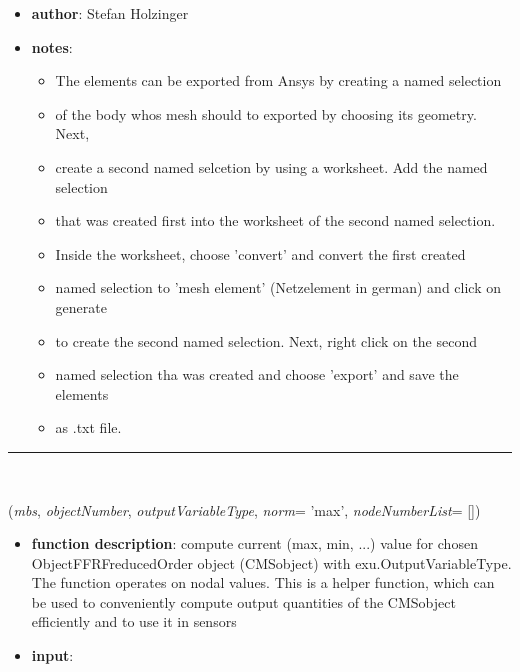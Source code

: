\begin{itemize}[leftmargin=1.4cm]
\begin{itemize}[leftmargin=1.4cm]
\begin{itemize}[leftmargin=1.4cm]
\begin{itemize}[leftmargin=0.5cm]
\begin{itemize}[leftmargin=1.4cm]
\begin{itemize}[leftmargin=1.4cm]
\begin{itemize}[leftmargin=1.4cm]
\begin{itemize}[leftmargin=0.5cm]
\begin{itemize}[leftmargin=0.7cm]
\item[--]
{\bf author}: Stefan Holzinger
\item[--]
{\bf notes}: \vspace{-6pt}
\begin{itemize}[leftmargin=1.2cm]
\setlength{\itemindent}{-0.7cm}
\item[]The elements can be exported from Ansys by creating a named selection
\item[]of the body whos mesh should to exported by choosing its geometry. Next,
\item[]create a second named selcetion by using a worksheet. Add the named selection
\item[]that was created first into the worksheet of the second named selection.
\item[]Inside the worksheet, choose 'convert' and convert the first created
\item[]named selection to 'mesh element' (Netzelement in german) and click on generate
\item[]to create the second named selection. Next, right click on the second
\item[]named selection tha was created and choose 'export' and save the elements
\item[]as .txt file.
\end{itemize}
\vspace{12pt}\end{itemize}
%
\noindent\rule{8cm}{0.75pt}\vspace{1pt} \\ 
\begin{flushleft}
\label{sec:FEM:CMSObjectComputeNorm}
({\it mbs}, {\it objectNumber}, {\it outputVariableType}, {\it norm}= 'max', {\it nodeNumberList}= [])
\end{flushleft}
\setlength{\itemindent}{0.7cm}
\begin{itemize}[leftmargin=0.7cm]
\item[--]
{\bf function description}: compute current (max, min, ...) value for chosen ObjectFFRFreducedOrder object (CMSobject) with exu.OutputVariableType. The function operates on nodal values. This is a helper function, which can be used to conveniently compute output quantities of the CMSobject efficiently and to use it in sensors
\item[--]
{\bf input}: \vspace{-6pt}

\end{itemize}
\end{itemize}
\end{itemize}
\end{itemize}
\end{itemize}
\end{itemize}
\end{itemize}
\end{itemize}
\end{itemize}
